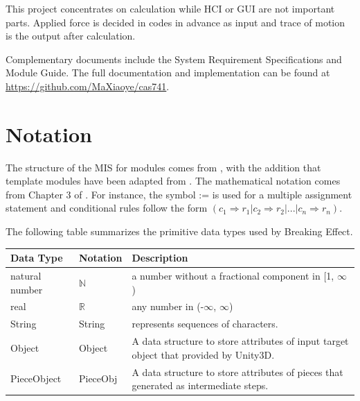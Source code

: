 \documentclass[12pt, titlepage]{article}
\newcommand{\progname}{Breaking Effect}
\begin{document}
This project concentrates on calculation while
HCI or GUI are not important parts. Applied force is decided in codes in advance as input
and trace of motion is the output after calculation.

Complementary documents include the System Requirement Specifications
and Module Guide.  The full documentation and implementation can be
found at \url{https://github.com/MaXiaoye/cas741}.

\section{Notation}

The structure of the MIS for modules comes from \citet{HoffmanAndStrooper1995},
with the addition that template modules have been adapted from
\cite{GhezziEtAl2003}.  The mathematical notation comes from Chapter 3 of
\citet{HoffmanAndStrooper1995}.  For instance, the symbol := is used for a
multiple assignment statement and conditional rules follow the form $(c_1
\Rightarrow r_1 | c_2 \Rightarrow r_2 | ... | c_n \Rightarrow r_n )$.

The following table summarizes the primitive data types used by \progname. 

\begin{center}
\renewcommand{\arraystretch}{1.2}
\noindent 
\begin{tabular}{l l p{7.5cm}} 
\toprule 
\textbf{Data Type} & \textbf{Notation} & \textbf{Description}\\ 
\midrule
natural number & $\mathbb{N}$ & a number without a fractional component in [1, $\infty$) \\
real & $\mathbb{R}$ & any number in (-$\infty$, $\infty$)\\
String & String & represents sequences of characters.\\
Object & Object & A data structure to store attributes of input target object that provided by Unity3D.\\
PieceObject & PieceObj & A data structure to store attributes of pieces that generated as intermediate steps.\\
\bottomrule
\end{tabular} 
\end{center}

\end{document}
